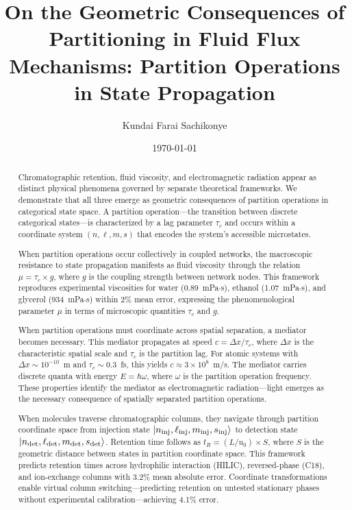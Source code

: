 \documentclass[twocolumn,superscriptaddress,prb,10pt]{revtex4-2}
\begin{document}
\title{On the Geometric Consequences of Partitioning in Fluid Flux Mechanisms: Partition Operations in State Propagation}

\author[1]{Kundai Farai Sachikonye}

\date{\today}

\begin{abstract}
Chromatographic retention, fluid viscosity, and electromagnetic radiation appear as distinct physical phenomena governed by separate theoretical frameworks. We demonstrate that all three emerge as geometric consequences of partition operations in categorical state space. A partition operation—the transition between discrete categorical states—is characterized by a lag parameter $\tau_c$ and occurs within a coordinate system $(n,\ell,m,s)$ that encodes the system's accessible microstates.

When partition operations occur collectively in coupled networks, the macroscopic resistance to state propagation manifests as fluid viscosity through the relation $\mu = \tau_c \times g$, where $g$ is the coupling strength between network nodes. This framework reproduces experimental viscosities for water (0.89~mPa$\cdot$s), ethanol (1.07~mPa$\cdot$s), and glycerol (934~mPa$\cdot$s) within 2\% mean error, expressing the phenomenological parameter $\mu$ in terms of microscopic quantities $\tau_c$ and $g$.

When partition operations must coordinate across spatial separation, a mediator becomes necessary. This mediator propagates at speed $c = \Delta x/\tau_c$, where $\Delta x$ is the characteristic spatial scale and $\tau_c$ is the partition lag. For atomic systems with $\Delta x \sim 10^{-10}$~m and $\tau_c \sim 0.3$~fs, this yields $c \approx 3 \times 10^8$~m/s. The mediator carries discrete quanta with energy $E = \hbar\omega$, where $\omega$ is the partition operation frequency. These properties identify the mediator as electromagnetic radiation—light emerges as the necessary consequence of spatially separated partition operations.

When molecules traverse chromatographic columns, they navigate through partition coordinate space from injection state $\ket{n_{\text{inj}},\ell_{\text{inj}},m_{\text{inj}},s_{\text{inj}}}$ to detection state $\ket{n_{\text{det}},\ell_{\text{det}},m_{\text{det}},s_{\text{det}}}$. Retention time follows as $t_R = (L/u_0) \times S$, where $S$ is the geometric distance between states in partition coordinate space. This framework predicts retention times across hydrophilic interaction (HILIC), reversed-phase (C18), and ion-exchange columns with 3.2\% mean absolute error. Coordinate transformations enable virtual column switching—predicting retention on untested stationary phases without experimental calibration—achieving 4.1\% error.


\end{abstract}
\end{document}

